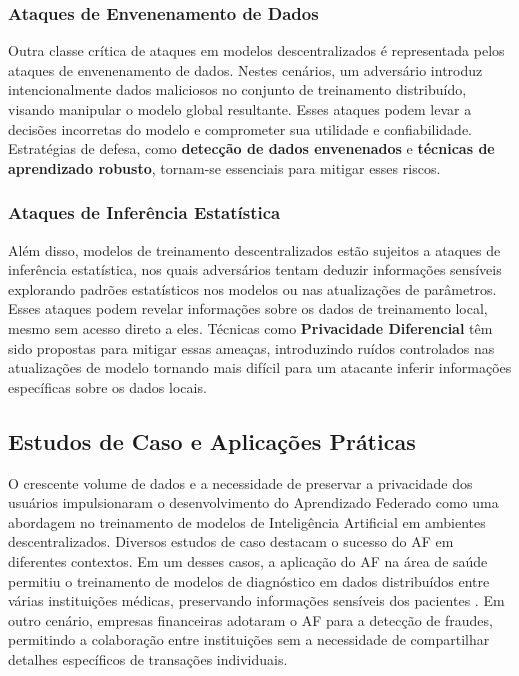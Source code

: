 \subsubsection{Ataques de Envenenamento de Dados}

Outra classe crítica de ataques em modelos descentralizados é representada pelos ataques de envenenamento de dados. Nestes cenários, um adversário introduz intencionalmente dados maliciosos no conjunto de treinamento distribuído, visando manipular o modelo global resultante. Esses ataques podem levar a decisões incorretas do modelo e comprometer sua utilidade e confiabilidade. Estratégias de defesa, como \textbf{detecção de dados envenenados} e \textbf{técnicas de aprendizado robusto}, tornam-se essenciais para mitigar esses riscos\cite{bagdasaryan2018backdoor}.

\subsubsection{Ataques de Inferência Estatística}

Além disso, modelos de treinamento descentralizados estão sujeitos a ataques de inferência estatística, nos quais adversários tentam deduzir informações sensíveis explorando padrões estatísticos nos modelos ou nas atualizações de parâmetros. Esses ataques podem revelar informações sobre os dados de treinamento local, mesmo sem acesso direto a eles. Técnicas como \textbf{Privacidade Diferencial} têm sido propostas para mitigar essas ameaças, introduzindo ruídos controlados nas atualizações de modelo tornando mais difícil para um atacante inferir informações específicas sobre os dados locais\cite{shokri2015privacy}.

\subsection{Estudos de Caso e Aplicações Práticas}

O crescente volume de dados e a necessidade de preservar a privacidade dos usuários impulsionaram o desenvolvimento do Aprendizado Federado como uma abordagem no treinamento de modelos de Inteligência Artificial em ambientes descentralizados. Diversos estudos de caso destacam o sucesso do AF em diferentes contextos. Em um desses casos, a aplicação do AF na área de saúde permitiu o treinamento de modelos de diagnóstico em dados distribuídos entre várias instituições médicas, preservando informações sensíveis dos pacientes \cite{smith2018privacy}. Em outro cenário, empresas financeiras adotaram o AF para a detecção de fraudes, permitindo a colaboração entre instituições sem a necessidade de compartilhar detalhes específicos de transações individuais\cite{jones2020federated}.

